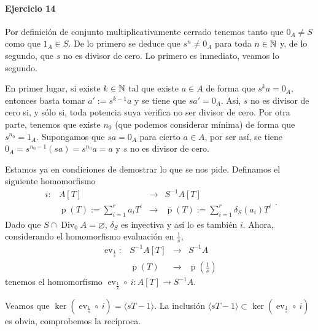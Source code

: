 \documentclass[./ejercicios.tex]{subfiles}
\begin{document}
\paragraph{Ejercicio 14} Por definición de conjunto multiplicativamente cerrado tenemos tanto que $0_A\neq S$ como que $1_A\in S$. De lo primero se deduce que $s^n\neq 0_A$ para toda $n\in\mathbb{N}$ y, de lo segundo, que $s$ no es divisor de cero. Lo primero es inmediato, veamos lo segundo.

En primer lugar, si existe $k\in\mathbb{N}$ tal que existe $a\in A$ de forma que $s^ka=0_A$, entonces basta tomar $a':=s^{k-1}a$ y se tiene que $sa'=0_A$. Así, $s$ no es divisor de cero si, y sólo si, toda potencia suya verifica no ser divisor de cero. Por otra parte, tenemos que existe $n_0$ (que podemos considerar mínima) de forma que $s^{n_0}=1_A$. Supongamos que $sa=0_A$ para cierto $a\in A$, por ser así, se tiene $0_A=s^{n_0-1}(sa)=s^{n_0}a=a$ y $s$ no es divisor de cero.

Estamos ya en condiciones de demostrar lo que se nos pide. Definamos el siguiente homomorfismo
$$\begin{array}{rrcl}
i:&A[T]&\longrightarrow&S^{-1}A[T]\\
&\operatorname{p}(T):=\sum_{i=1}^ra_iT^i&\longrightarrow&\overline{\operatorname{p}}(T):=\sum_{i=1}^r\delta_S(a_i)T^i
\end{array}.$$
Dado que $S\cap\operatorname{Div}_0A=\varnothing$, $\delta_S$ es inyectiva y así lo es también $i$. Ahora, considerando el homomorfismo evaluación en $\frac{1}{s}$,
$$\begin{array}{rrcl}
\operatorname{ev}_{\frac{1}{s}}:&S^{-1}A[T]&\longrightarrow&S^{-1}A\\
&\overline{\operatorname{p}}(T)&\longrightarrow&\overline{\operatorname{p}}\left(\frac{1}{s}\right)
\end{array}$$
tenemos el homomorfismo $\operatorname{ev}_{\frac{1}{s}}\circ\  i:A[T]\longrightarrow S^{-1}A.$

Veamos que $\ker(\operatorname{ev}_{\frac{1}{s}}\circ\  i)=\langle sT-1\rangle.$ La inclusión $\langle sT-1\rangle\subset \ker(\operatorname{ev}_{\frac{1}{s}}\circ\  i)$ es obvia, comprobemos la recíproca.
\end{document}
